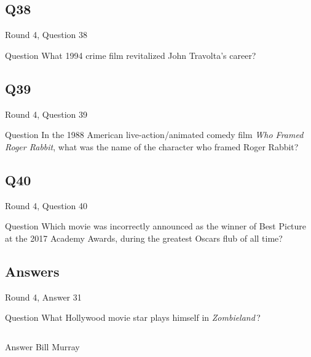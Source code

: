 \documentclass[11pt]{beamer}
\begin{document}
\subsection*{Q38}
\begin{frame}[t]{Round 4, Question 38}
\vspace{2em}
\begin{block}{Question}
What 1994 crime film revitalized John Travolta's career?
\end{block}
\end{frame}
    

\subsection*{Q39}
\begin{frame}[t]{Round 4, Question 39}
\vspace{2em}
\begin{block}{Question}
In the 1988 American live-action/animated comedy film \emph{Who Framed Roger Rabbit}, what was the name of the character who framed Roger Rabbit?
\end{block}
\end{frame}
    

\subsection*{Q40}
\begin{frame}[t]{Round 4, Question 40}
\vspace{2em}
\begin{block}{Question}
Which movie was incorrectly announced as the winner of Best Picture at the 2017 Academy Awards, during the greatest Oscars flub of all time?
\end{block}
\end{frame}
    
\subsection{Answers}

\begin{frame}[t]{Round 4, Answer 31}
\vspace{2em}
\begin{block}{Question}
What Hollywood movie star plays himself in \emph{Zombieland}\,?
\end{block}
\pause{}
\begin{columns}[T,totalwidth=\linewidth]
\begin{column}{0.35\linewidth}
\begin{block}{Answer}
Bill Murray
\end{block}
\end{column}
\begin{column}{0.6\linewidth}
\begin{center}
\texttt{[image: \{Images/bill-murrays-zombieland]}.jpg}
\end{center}
\end{column}
\end{columns}
\end{frame}
    
\end{document}
